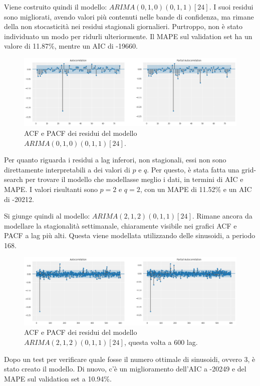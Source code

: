 Viene costruito quindi il modello: $ARIMA (0,1,0) (0,1,1) [24]$. I suoi residui sono migliorati, avendo valori più contenuti nelle bande di confidenza, ma rimane della non stocasticità nei residui stagionali giornalieri. Purtroppo, non è stato individuato un modo per ridurli ulteriormente. Il MAPE sul validation set ha un valore di 11.87\%, mentre un AIC di -19660. 

\begin{figure}[H]
\centering
\includegraphics[width=13cm]{Pictures/acf_pacf_2.png}
\caption{ACF e PACF dei residui del modello $ARIMA (0,1,0) (0,1,1) [24]$.}
\end{figure}

Per quanto riguarda i residui a lag inferori, non stagionali, essi non sono direttamente interpretabili a dei valori di $p$ e $q$. Per questo, è stata fatta una grid-search per trovare il modello che modellasse meglio i dati, in termini di AIC e MAPE. I valori risultanti sono $p=2$ e $q=2$, con un MAPE di 11.52\% e un AIC di -20212. 

Si giunge quindi al modello: $ARIMA (2,1,2) (0,1,1) [24]$. Rimane ancora da modellare la stagionalità settimanale, chiaramente visibile nei grafici ACF e PACF a lag più alti. Questa viene modellata utilizzando delle sinusoidi, a periodo 168. 

\begin{figure}[H]
\centering
\includegraphics[width=13cm]{Pictures/acf_pacf_3.png}
\caption{ACF e PACF dei residui del modello $ARIMA (2,1,2) (0,1,1) [24]$, questa volta a 600 lag.}
\end{figure}

Dopo un test per verificare quale fosse il numero ottimale di sinusoidi, ovvero 3, è stato creato il modello. Di nuovo, c'è un miglioramento dell'AIC a -20249 e del MAPE sul validation set a 10.94\%. 

